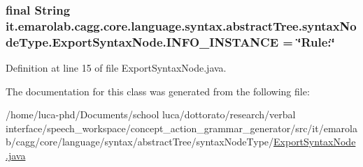 \hypertarget{classit_1_1emarolab_1_1cagg_1_1core_1_1language_1_1syntax_1_1abstractTree_1_1syntaxNodeType_1_1ExportSyntaxNode_a625a6003b460943010fb01262198472a}{
\subsubsection[{I\-N\-F\-O\-\_\-\-I\-N\-S\-T\-A\-N\-C\-E}]{\setlength{\rightskip}{0pt plus 5cm}final String it.\-emarolab.\-cagg.\-core.\-language.\-syntax.\-abstract\-Tree.\-syntax\-Node\-Type.\-Export\-Syntax\-Node.\-I\-N\-F\-O\-\_\-\-I\-N\-S\-T\-A\-N\-C\-E = \char`\"{}Rule\-:\char`\"{}\hspace{0.3cm}{\ttfamily [static]}}}\label{classit_1_1emarolab_1_1cagg_1_1core_1_1language_1_1syntax_1_1abstractTree_1_1syntaxNodeType_1_1ExportSyntaxNode_a625a6003b460943010fb01262198472a}


Definition at line 15 of file Export\-Syntax\-Node.\-java.



The documentation for this class was generated from the following file\-:\begin{DoxyCompactItemize}
\item 
/home/luca-\/phd/\-Documents/school luca/dottorato/research/verbal interface/speech\-\_\-workspace/concept\-\_\-action\-\_\-grammar\-\_\-generator/src/it/emarolab/cagg/core/language/syntax/abstract\-Tree/syntax\-Node\-Type/\hyperlink{ExportSyntaxNode_8java}{Export\-Syntax\-Node.\-java}\end{DoxyCompactItemize}
